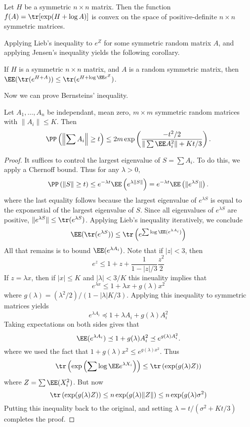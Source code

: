 \begin{theorem}
    Let $H$ be a symmetric $n \times n$ matrix. Then the function $f(A) = \tr[\exp(H + \log A)]$ is convex on the space of positive-definite $n \times n$ symmetric matrices.
\end{theorem}

Applying Lieb's inequality to $e^Z$ for some symmetric random matrix $A$, and applying Jensen's inequality yields the following corollary.

\begin{corollary}
    If $H$ is a symmetric $n \times n$ matrix, and $A$ is a random symmetric matrix, then $\EE(\tr(e^{H + A})) \leq \tr(e^{H + \log \EE e^Z})$.
\end{corollary}

Now we can prove Bernsteins' inequality.

\begin{theorem}
    Let $A_1, \dots, A_n$ be independant, mean zero, $m \times m$ symmetric random matrices with $\| A_i \| \leq K$. Then
    \[ \PP \left( \left\| \sum A_i \right\| \geq t \right) \leq 2m \exp \left( \frac{-t^2/2}{\|\sum \EE A_i^2 \| + Kt/3} \right). \]
\end{theorem}
\begin{proof}
    It suffices to control the largest eigenvalue of $S = \sum A_i$. To do this, we apply a Chernoff bound. Thus for any $\lambda > 0$,
    \[ \PP \left( \| S \| \geq t \right) \leq e^{- \lambda t} \EE \left( e^{\lambda \| S \|} \right) = e^{-\lambda t} \EE \left( \| e^{\lambda S} \| \right). \]
    where the last equality follows because the largest eigenvalue of $e^{\lambda S}$ is equal to the exponential of the largest eigenvalue of $S$. Since all eigenvalues of $e^{\lambda S}$ are positive, $\| e^{\lambda S} \| \leq \tr(e^{\lambda S})$. Applying Lieb's inequality iteratively, we conclude
    \[ \EE(\tr(e^{\lambda S})) \leq \tr \left( e^{\sum \log \EE(e^{\lambda A_i})} \right) \]
    All that remains is to bound $\EE(e^{\lambda A_i})$. Note that if $|z| < 3$, then
    \[ e^z \leq 1 + z + \frac{1}{1 - |z|/3} \frac{z^2}{2} \]
    If $z = \lambda x$, then if $|x| \leq K$ and $|\lambda| < 3/K$ this ineuality implies that
    \[ e^{\lambda x} \leq 1 + \lambda x + g(\lambda) x^2 \]
    where $g(\lambda) = (\lambda^2/2)/(1 - |\lambda|K/3)$. Applying this inequality to symmetric matrices yields
    \[ e^{\lambda A_i} \preceq 1 + \lambda A_i + g(\lambda) A_i^2 \]
    Taking expectations on both sides gives that
    \[ \EE(e^{\lambda A_i}) \preceq 1 + g(\lambda) A_i^2 \preceq e^{g(\lambda) A_i^2}. \]
    where we used the fact that $1 + g(\lambda) x^2 \leq e^{g(\lambda) x^2}$. Thus
    \[ \tr \left( \exp \left( \sum \log \EE e^{\lambda X_i} \right) \right) \leq \tr \left( \exp(g(\lambda) Z) \right) \]
    where $Z = \sum \EE(X_i^2)$. But now
    \[ \tr \left( \exp(g(\lambda) Z) \right) \leq n \exp(g(\lambda) \| Z \|) \leq n \exp(g(\lambda) \sigma^2) \]
    Putting this inequality back to the original, and setting $\lambda = t/(\sigma^2 + Kt/3)$ completes the proof.
\end{proof}

